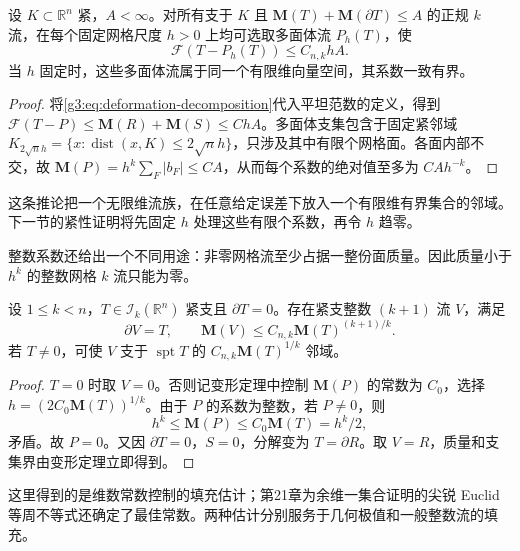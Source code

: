 \begin{corollary}\label{g3:cor:uniform-polyhedral-flat-approximation}
	设 \(K\subset\mathbb R^n\) 紧，\(A<\infty\)。对所有支于 \(K\) 且
	\(\mathbf M(T)+\mathbf M(\partial T)\le A\) 的正规 \(k\) 流，在每个固定网格尺度 \(h>0\) 上均可选取多面体流 \(P_h(T)\)，使
	\[
	\mathcal F(T-P_h(T))\le C_{n,k}hA.
	\]
	当 \(h\) 固定时，这些多面体流属于同一个有限维向量空间，其系数一致有界。
\end{corollary}
\begin{proof}
	将\eqref{g3:eq:deformation-decomposition}代入平坦范数的定义，得到
	\(\mathcal F(T-P)\le\mathbf M(R)+\mathbf M(S)\le ChA\)。多面体支集包含于固定紧邻域 \(K_{2\sqrt n h}=\{x:\operatorname{dist}(x,K)\le2\sqrt n h\}\)，只涉及其中有限个网格面。各面内部不交，故
	\(\mathbf M(P)=h^k\sum_F|b_F|\le CA\)，从而每个系数的绝对值至多为 \(CAh^{-k}\)。
\end{proof}

这条推论把一个无限维流族，在任意给定误差下放入一个有限维有界集合的邻域。下一节的紧性证明将先固定 \(h\) 处理这些有限个系数，再令 \(h\) 趋零。

整数系数还给出一个不同用途：非零网格流至少占据一整份面质量。因此质量小于 \(h^k\) 的整数网格 \(k\) 流只能为零。

\begin{corollary}\label{g3:cor:integral-cycle-isoperimetric}
	设 \(1\le k<n\)，\(T\in\mathcal I_k(\mathbb R^n)\) 紧支且 \(\partial T=0\)。存在紧支整数 \((k+1)\) 流 \(V\)，满足
	\[
	\partial V=T,\qquad
	\mathbf M(V)\le C_{n,k}\mathbf M(T)^{(k+1)/k}.
	\]
	若 \(T\ne0\)，可使 \(V\) 支于 \(\operatorname{spt}T\) 的
	\(C_{n,k}\mathbf M(T)^{1/k}\) 邻域。
\end{corollary}
\begin{proof}
	\(T=0\) 时取 \(V=0\)。否则记变形定理中控制 \(\mathbf M(P)\) 的常数为 \(C_0\)，选择
	\(h=(2C_0\mathbf M(T))^{1/k}\)。由于 \(P\) 的系数为整数，若 \(P\ne0\)，则
	\[
	h^k\le\mathbf M(P)\le C_0\mathbf M(T)=h^k/2,
	\]
	矛盾。故 \(P=0\)。又因 \(\partial T=0\)，\(S=0\)，分解变为 \(T=\partial R\)。取 \(V=R\)，质量和支集界由变形定理立即得到。
\end{proof}

这里得到的是维数常数控制的填充估计；第21章为余维一集合证明的尖锐 Euclid 等周不等式还确定了最佳常数。两种估计分别服务于几何极值和一般整数流的填充。
